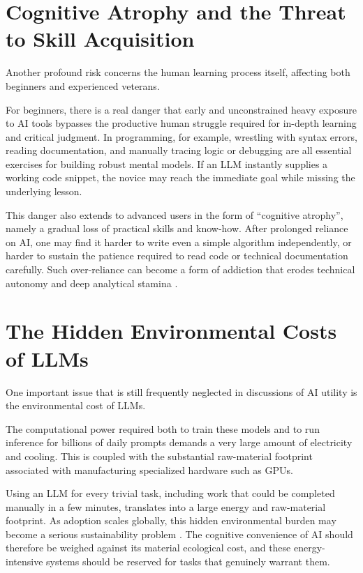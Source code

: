 \documentclass[10pt,a4paper]{article}
\begin{document}
\section{Cognitive Atrophy and the Threat to Skill Acquisition}
Another profound risk concerns the human learning process itself, affecting both beginners and experienced veterans.

For beginners, there is a real danger that early and unconstrained heavy exposure to AI tools bypasses the productive human struggle required for in-depth learning and critical judgment. In programming, for example, wrestling with syntax errors, reading documentation, and manually tracing logic or debugging are all essential exercises for building robust mental models. If an LLM instantly supplies a working code snippet, the novice may reach the immediate goal while missing the underlying lesson.

This danger also extends to advanced users in the form of ``cognitive atrophy'', namely a gradual loss of practical skills and know-how. After prolonged reliance on AI, one may find it harder to write even a simple algorithm independently, or harder to sustain the patience required to read code or technical documentation carefully. Such over-reliance can become a form of addiction that erodes technical autonomy and deep analytical stamina \cite{clowes2024}.

\section{The Hidden Environmental Costs of LLMs}
One important issue that is still frequently neglected in discussions of AI utility is the environmental cost of LLMs.

The computational power required both to train these models and to run inference for billions of daily prompts demands a very large amount of electricity and cooling. This is coupled with the substantial raw-material footprint associated with manufacturing specialized hardware such as GPUs.

Using an LLM for every trivial task, including work that could be completed manually in a few minutes, translates into a large energy and raw-material footprint. As adoption scales globally, this hidden environmental burden may become a serious sustainability problem \cite{strubell2020}. The cognitive convenience of AI should therefore be weighed against its material ecological cost, and these energy-intensive systems should be reserved for tasks that genuinely warrant them.
\end{document}
